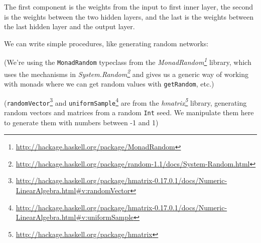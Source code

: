 \documentclass[]{article}
\newenvironment{Shaded}{}{}
\newcommand{\KeywordTok}[1]{\textcolor[rgb]{0.00,0.44,0.13}{\textbf{{#1}}}}
\newcommand{\DataTypeTok}[1]{\textcolor[rgb]{0.56,0.13,0.00}{{#1}}}
\newcommand{\DecValTok}[1]{\textcolor[rgb]{0.25,0.63,0.44}{{#1}}}
\newcommand{\CommentTok}[1]{\textcolor[rgb]{0.38,0.63,0.69}{\textit{{#1}}}}
\newcommand{\OtherTok}[1]{\textcolor[rgb]{0.00,0.44,0.13}{{#1}}}
\newcommand{\FunctionTok}[1]{\textcolor[rgb]{0.02,0.16,0.49}{{#1}}}
\newcommand{\NormalTok}[1]{{#1}}
\renewcommand{\href}[2]{#2\footnote{\url{#1}}}
\begin{document}
The first component is the weights from the input to first inner layer, the
second is the weights between the two hidden layers, and the last is the weights
between the last hidden layer and the output layer.

We can write simple procedures, like generating random networks:

\begin{Shaded}
\end{Shaded}

(We're using the \texttt{MonadRandom} typeclass from the
\emph{\href{http://hackage.haskell.org/package/MonadRandom}{MonadRandom}}
library, which uses the mechanisms in
\emph{\href{http://hackage.haskell.org/package/random-1.1/docs/System-Random.html}{System.Random}}
and gives us a generic way of working with monads where we can get random values
with \texttt{getRandom}, etc.)

(\href{http://hackage.haskell.org/package/hmatrix-0.17.0.1/docs/Numeric-LinearAlgebra.html\#v:randomVector}{\texttt{randomVector}}
and
\href{http://hackage.haskell.org/package/hmatrix-0.17.0.1/docs/Numeric-LinearAlgebra.html\#v:uniformSample}{\texttt{uniformSample}}
are from the \emph{\href{http://hackage.haskell.org/package/hmatrix}{hmatrix}}
library, generating random vectors and matrices from a random \texttt{Int} seed.
We manipulate them here to generate them with numbers between -1 and 1)
\end{document}
